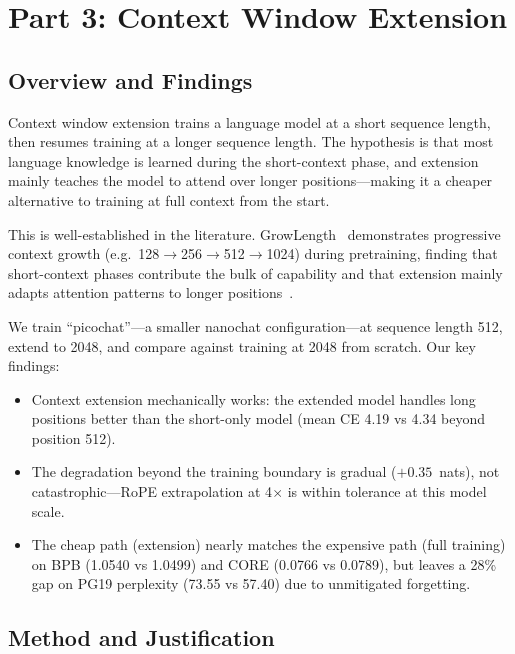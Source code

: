 
\section{Part 3: Context Window Extension}

\subsection{Overview and Findings}

Context window extension trains a language model at a short sequence length, then resumes training at a longer sequence length. The hypothesis is that most language knowledge is learned during the short-context phase, and extension mainly teaches the model to attend over longer positions---making it a cheaper alternative to training at full context from the start.

This is well-established in the literature. GrowLength~\cite{growlength} demonstrates progressive context growth (e.g.\ 128$\to$256$\to$512$\to$1024) during pretraining, finding that short-context phases contribute the bulk of capability and that extension mainly adapts attention patterns to longer positions~\cite{skyladder,prolong}.

We train ``picochat''---a smaller nanochat configuration---at sequence length 512, extend to 2048, and compare against training at 2048 from scratch. Our key findings:

\begin{itemize}
  \item Context extension mechanically works: the extended model handles long positions better than the short-only model (mean CE 4.19 vs 4.34 beyond position 512).
  \item The degradation beyond the training boundary is gradual ($+0.35$~nats), not catastrophic---RoPE extrapolation at 4$\times$ is within tolerance at this model scale.
  \item The cheap path (extension) nearly matches the expensive path (full training) on BPB (1.0540 vs 1.0499) and CORE (0.0766 vs 0.0789), but leaves a 28\% gap on PG19 perplexity (73.55 vs 57.40) due to unmitigated forgetting.
\end{itemize}

\subsection{Method and Justification}


